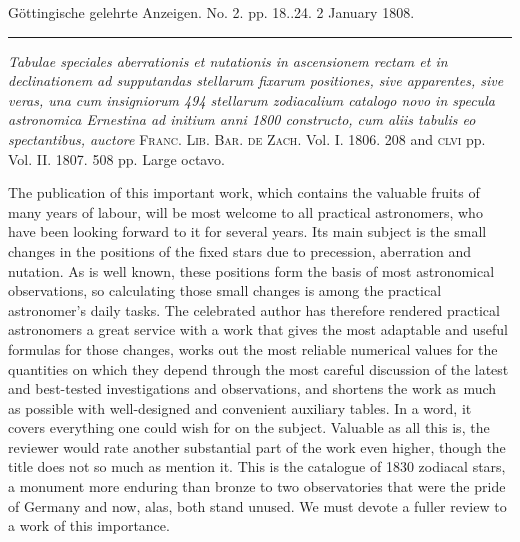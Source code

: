 \clearpage
{}
\hypertarget{native-494-lower}{}\label{native-494-lower}
\begin{center}
\small Göttingische gelehrte Anzeigen. No. 2. pp. 18..24. 2 January 1808.\\[3pt]
\rule{.72\linewidth}{.3pt}
\end{center}

\emph{Tabulae speciales aberrationis et nutationis in ascensionem rectam et in declinationem ad supputandas stellarum fixarum positiones, sive apparentes, sive veras, una cum insigniorum 494 stellarum zodiacalium catalogo novo in specula astronomica Ernestina ad initium anni \textup{1800} constructo, cum aliis tabulis eo spectantibus, auctore} \textsc{Franc. Lib. Bar. de Zach}. Vol. I. 1806. 208 and \textsc{clvi} pp. Vol. II. 1807. 508 pp. Large octavo.

The publication of this important work, which contains the valuable fruits of many years of labour, will be most welcome to all practical astronomers, who have been looking forward to it for several years. Its main subject is the small changes in the positions of the fixed stars due to precession, aberration and nutation.%
%
\space As is well known, these positions form the basis of most astronomical observations, so calculating those small changes is among the practical astronomer’s daily tasks. The celebrated author has therefore rendered practical astronomers a great service with a work that gives the most adaptable and useful formulas for those changes, works out the most reliable numerical values for the quantities on which they depend through the most careful discussion of the latest and best-tested investigations and observations, and shortens the work as much as possible with well-designed and convenient auxiliary tables. In a word, it covers everything one could wish for on the subject. Valuable as all this is, the reviewer would rate another substantial part of the work even higher, though the title does not so much as mention it. This is the catalogue of 1830 zodiacal stars, a monument more enduring than bronze to two observatories that were the pride of Germany and now, alas, both stand unused. We must devote a fuller review to a work of this importance.

